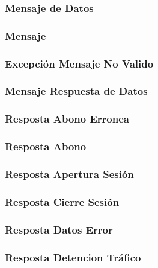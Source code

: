 \documentclass[a4paper,titlepage]{article}
\begin{document}
\subsubsection{Mensaje de Datos}

\subsubsection{Mensaje}

\subsubsection{Excepción Mensaje No Valido}

\subsubsection{Mensaje Respuesta de Datos}

\subsubsection{Resposta Abono Erronea}

\subsubsection{Resposta Abono}

\subsubsection{Resposta Apertura Sesión}

\subsubsection{Resposta Cierre Sesión}

\subsubsection{Resposta Datos Error}

\subsubsection{Resposta Detencion Tráfico}

\end{document}
